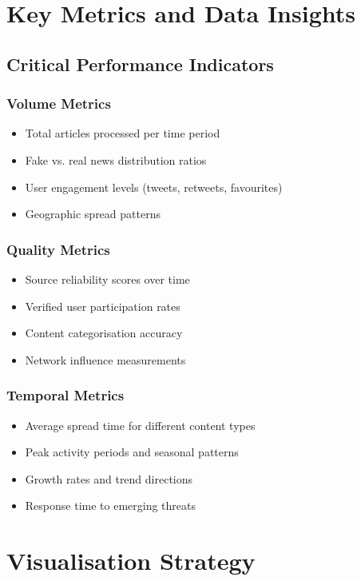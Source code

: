\documentclass[11pt,a4paper]{article}
\begin{document}
\section{Key Metrics and Data Insights}

\subsection{Critical Performance Indicators}

\subsubsection{Volume Metrics}
\begin{itemize}
    \item Total articles processed per time period
    \item Fake vs. real news distribution ratios
    \item User engagement levels (tweets, retweets, favourites)
    \item Geographic spread patterns
\end{itemize}

\subsubsection{Quality Metrics}
\begin{itemize}
    \item Source reliability scores over time
    \item Verified user participation rates
    \item Content categorisation accuracy
    \item Network influence measurements
\end{itemize}

\subsubsection{Temporal Metrics}
\begin{itemize}
    \item Average spread time for different content types
    \item Peak activity periods and seasonal patterns
    \item Growth rates and trend directions
    \item Response time to emerging threats
\end{itemize}

\section{Visualisation Strategy}
\end{document}
